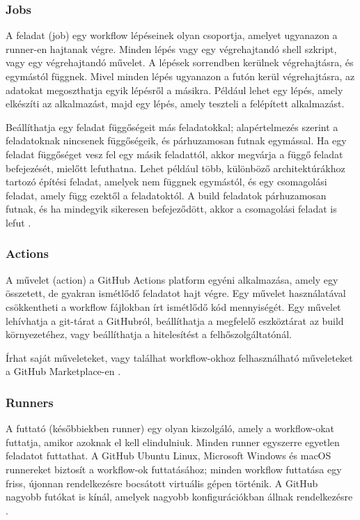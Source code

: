 \subsubsection*{Jobs}
A feladat (job) egy workflow lépéseinek olyan csoportja, amelyet ugyanazon a runner-en hajtanak végre.
Minden lépés vagy egy végrehajtandó shell szkript, vagy egy végrehajtandó művelet.
A lépések sorrendben kerülnek végrehajtásra, és egymástól függnek. Mivel minden lépés ugyanazon a futón kerül végrehajtásra, az adatokat megoszthatja egyik lépésről a másikra. Például lehet egy lépés, amely elkészíti az alkalmazást, majd egy lépés, amely teszteli a felépített alkalmazást.

Beállíthatja egy feladat függőségeit más feladatokkal; alapértelmezés szerint a feladatoknak nincsenek függőségeik, és párhuzamosan futnak egymással.
Ha egy feladat függőséget vesz fel egy másik feladattól, akkor megvárja a függő feladat befejezését, mielőtt lefuthatna. Lehet például több, különböző architektúrákhoz tartozó építési feladat, amelyek nem függnek egymástól, és egy csomagolási feladat, amely függ ezektől a feladatoktól.
A build feladatok párhuzamosan futnak, és ha mindegyik sikeresen befejeződött, akkor a csomagolási feladat is lefut \cite{github}.

\subsubsection*{Actions}
A művelet (action) a GitHub Actions platform egyéni alkalmazása, amely egy összetett, de gyakran ismétlődő feladatot hajt végre.
Egy művelet használatával csökkentheti a workflow fájlokban írt ismétlődő kód mennyiségét.
Egy művelet lehívhatja a git-tárat a GitHubról, beállíthatja a megfelelő eszköztárat az build környezetéhez, vagy beállíthatja a hitelesítést a felhőszolgáltatónál.

Írhat saját műveleteket, vagy találhat workflow-okhoz felhasználható műveleteket a GitHub Marketplace-en \cite{github}.

\subsubsection*{Runners}
A futtató (későbbiekben runner) egy olyan kiszolgáló, amely a workflow-okat futtatja, amikor azoknak el kell elindulniuk.
Minden runner egyszerre egyetlen feladatot futtathat.
A GitHub Ubuntu Linux, Microsoft Windows és macOS runnereket biztosít a workflow-ok futtatásához; minden workflow futtatása egy friss, újonnan rendelkezésre bocsátott virtuális gépen történik.
A GitHub nagyobb futókat is kínál, amelyek nagyobb konfigurációkban állnak rendelkezésre \cite{github}.

